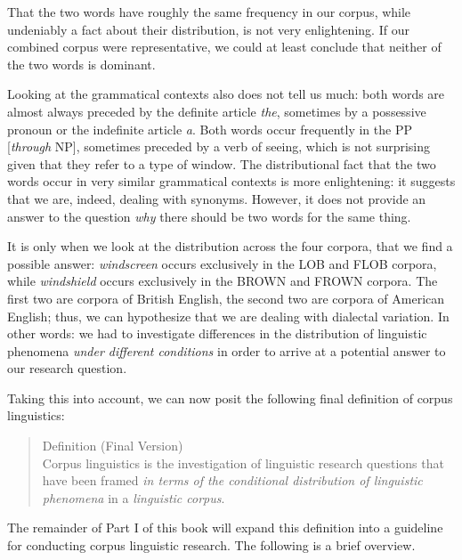 That the two words have roughly the same frequency  in our corpus, while undeniably a fact about their distribution,  is not very enlightening. If our combined corpus were representative, we could at least conclude that neither of the two words is dominant.

Looking at the grammatical contexts also does not tell us much: both words are almost always preceded by the definite article  \textit{the}, sometimes by a possessive pronoun  or the indefinite article \textit{a}. Both words occur frequently in the PP [\textit{through} NP], sometimes preceded by a verb  of seeing, which is not surprising given that they refer to a type of window. The distributional  fact that the two words occur in very similar grammatical contexts is more enlightening: it suggests that we are, indeed, dealing with synonyms.  However, it does not provide an answer to the question \emph{why} there should be two words for the same thing.

It is only when we look at the distribution  across the four corpora, that we find a possible answer: \textit{windscreen} occurs exclusively in the LOB  and FLOB  corpora, while \textit{windshield} occurs exclusively in the BROWN  and FROWN  corpora. The first two are corpora of British  English, the second two are corpora of American  English; thus, we can hypothesize  that we are dealing with dialectal variation.  In other words: we had to investigate differences in the distribution  of linguistic phenomena \emph{under different conditions} in order to arrive at a potential answer to our research question.

Taking this into account, we can now posit the following final definition of corpus linguistics:

\begin{quotation}
Definition (Final Version) \\
Corpus linguistics is the investigation of linguistic research questions that have been framed \emph{in terms of the conditional distribution  of linguistic phenomena} in a \emph{linguistic corpus}.
\end{quotation}

The remainder of Part I of this book will expand this definition into a guideline for conducting corpus linguistic research. The following is a brief overview.

